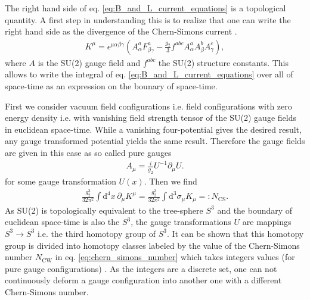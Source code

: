 \documentclass[13pt,a4paper,titlepage]{article}
\begin{document}
The right hand side of eq. \eqref{eq:B_and_L_current_equations} is a topological quantity.
A first step in understanding this is to realize that one can write the right hand side as the divergence of the Chern-Simons current \cite[eq. 4.2, 4.3]{Cline:2006ts_Baryogenesis}.
\begin{align}
    \label{eq:chern_simons_current}
    K^\mu = \epsilon^{\mu \alpha \beta \gamma} \left( A^a_\alpha F^a_{\beta \gamma} - \frac{g_2}{3} f^{abc} A^a_\alpha A^b_\beta A^c_\gamma \right),
\end{align}
where $A$ is the SU(2) gauge field and $f^{abc}$ the SU(2) structure constants.
This allows to write the integral of eq. \eqref{eq:B_and_L_current_equations}
over all of space-time as an expression on the bounary of space-time.

\noindent
First we consider vacuum field configurations i.e. field configurations with zero energy density i.e. with vanishing field strength tensor of the SU(2) gauge fields in euclidean space-time. While a vanishing four-potential gives the desired result, any gauge transformed potential yields the same result.
Therefore the gauge fields are given in this case as so called pure gauges \cite[sec. 2.1]{Di_Luzio_2020_Landscape_of_QCD_Axion_models}
\begin{align}
    A_\mu = \frac{i}{g_2} U^{-1} \partial_\mu U.
\end{align}
for some gauge transformation $U(x)$.
Then we find
\begin{align}
    \label{eq:chern_simons_number}
    \frac{g_2^3}{32 \pi^2} \int \mathrm{d}^4 x \, \partial_\mu K^\mu =
    \frac{g_2^3}{32 \pi^2} \int \mathrm{d}^3 \sigma_\mu K_\mu
     =: N_{\mathrm{CS}}.
\end{align}
As SU(2) is topologically equivalent to the tree-sphere $S^3$ and the boundary of euclidean space-time is also the $S^3$, the gauge transformations $U$ are
mappings $S^3 \to S^3$ i.e. the third homotopy group of $S^3$.
It can be shown that this homotopy group is divided into homotopy classes labeled by the value of the Chern-Simons number $N_\mathrm{CW}$ in eq. \eqref{eq:chern_simons_number} which takes integers values (for pure gauge configurations) \cite{homotopy_spheres}.
As the integers are a discrete set, one can not continuously deform a gauge configuration into another one with a different Chern-Simons number.
\end{document}
